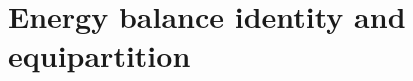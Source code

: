 \documentclass[EJP]{ejpecp} %
\newcommand{\mc}[1]{{\mathcal #1}}
\newcommand\E{{\mathbb E}}
\newcommand\T{{\mathbb I}}
\newcommand\Om{\Omega}
\newcommand{\dd  }{\mathrm{d}}
\renewcommand{\tilde}{\widetilde}
\renewcommand{\bar}{\overline}
\numberwithin{equation}{section}
\newcommand{\mm}[1]{{\color{red}#1}}
\begin{document}











\section{Energy balance identity and equipartition}
\label{sec:wigner}
\end{document}
